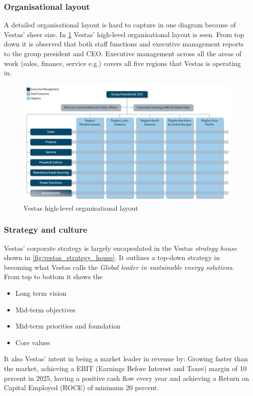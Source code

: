 \subsubsection{Organisational layout}

A detailed organisational layout is hard to capture in one diagram because of Vestas' sheer size. In \cref{fig:vestas_organ_layout_1} Vestas' high-level organisational layout is seen. From top down it is observed that both staff functions and executive management reports to the group president and CEO. Executive management across all the areas of work (sales, finance, service e.g.) covers all five regions that Vestas is operating in.
\begin{figure}[ht]
	\centering
	\includegraphics[width=0.8\linewidth]{Graphics/vestasOrganisationalLayout1.jpg}
	\caption{Vestas high-level organisational layout}
	\label{fig:vestas_organ_layout_1}
\end{figure}

\newpage
\subsubsection{Strategy and culture}
Vestas' corporate strategy is largely encapsulated in the Vestas \textit{strategy house} shown in \cref{fig:vestas_strategy_house}. It outlines a top-down strategy in becoming what Vestas calls the \textit{Global leader in sustainable energy solutions}. From top to bottom it shows the
\begin{itemize}
	\item Long term vision
	\item Mid-term objectives
	\item Mid-term priorities and foundation
	\item Core values
\end{itemize}
It also Vestas' intent in being a market leader in revenue by: Growing faster than the market, achieving a EBIT (Earnings Before Interest and Taxes) margin of 10 percent in 2025, having a positive cash flow every year and achieving a Return on Capital Employed (ROCE) of minimum 20 percent. 

